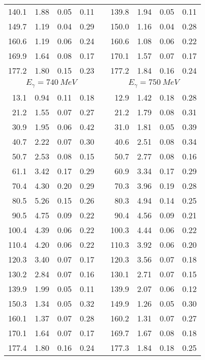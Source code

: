 \begin{table}[htbp]
\begin{center}
\begin{tabular}{|r|r|c|c|l|r|r|c|c|}
140.1 &  1.88 &  0.05 &  0.11 & & 139.8 &  1.94 &  0.05 &  0.11 \\ 
149.7 &  1.19 &  0.04 &  0.29 & & 150.0 &  1.16 &  0.04 &  0.28 \\ 
160.6 &  1.19 &  0.06 &  0.24 & & 160.6 &  1.08 &  0.06 &  0.22 \\ 
169.9 &  1.64 &  0.08 &  0.17 & & 170.1 &  1.57 &  0.07 &  0.17 \\ 
177.2 &  1.80 &  0.15 &  0.23 & & 177.2 &  1.84 &  0.16 &  0.24 \\ 
\hline 
\hline 
\multicolumn{4}{|c|}{ $E_{\gamma}=740~MeV$} & & 
\multicolumn{4}{c|}{ $E_{\gamma}=750~MeV$} \\ 
\cline{1-4} 
\cline{6-9} 
 13.1 &  0.94 &  0.11 &  0.18 & &  12.9 &  1.42 &  0.18 &  0.28 \\ 
 21.2 &  1.55 &  0.07 &  0.27 & &  21.2 &  1.79 &  0.08 &  0.31 \\ 
 30.9 &  1.95 &  0.06 &  0.42 & &  31.0 &  1.81 &  0.05 &  0.39 \\ 
 40.7 &  2.22 &  0.07 &  0.30 & &  40.6 &  2.51 &  0.08 &  0.34 \\ 
 50.7 &  2.53 &  0.08 &  0.15 & &  50.7 &  2.77 &  0.08 &  0.16 \\ 
 61.1 &  3.42 &  0.17 &  0.29 & &  60.9 &  3.34 &  0.17 &  0.29 \\ 
 70.4 &  4.30 &  0.20 &  0.29 & &  70.3 &  3.96 &  0.19 &  0.28 \\ 
 80.5 &  5.26 &  0.15 &  0.26 & &  80.3 &  4.94 &  0.14 &  0.25 \\ 
 90.5 &  4.75 &  0.09 &  0.22 & &  90.4 &  4.56 &  0.09 &  0.21 \\ 
100.4 &  4.39 &  0.06 &  0.22 & & 100.3 &  4.44 &  0.06 &  0.22 \\ 
110.4 &  4.20 &  0.06 &  0.22 & & 110.3 &  3.92 &  0.06 &  0.20 \\ 
120.3 &  3.40 &  0.07 &  0.17 & & 120.3 &  3.56 &  0.07 &  0.18 \\ 
130.2 &  2.84 &  0.07 &  0.16 & & 130.1 &  2.71 &  0.07 &  0.15 \\ 
139.9 &  1.99 &  0.05 &  0.11 & & 139.9 &  2.07 &  0.06 &  0.12 \\ 
150.3 &  1.34 &  0.05 &  0.32 & & 149.9 &  1.26 &  0.05 &  0.30 \\ 
160.1 &  1.37 &  0.07 &  0.28 & & 160.2 &  1.31 &  0.07 &  0.27 \\ 
170.1 &  1.64 &  0.07 &  0.17 & & 169.7 &  1.67 &  0.08 &  0.18 \\ 
177.4 &  1.80 &  0.16 &  0.24 & & 177.3 &  1.84 &  0.18 &  0.25 \\ 
\cline{1-4} 
\cline{6-9} 
\end{tabular} 

\end{center} 
\end{table}
